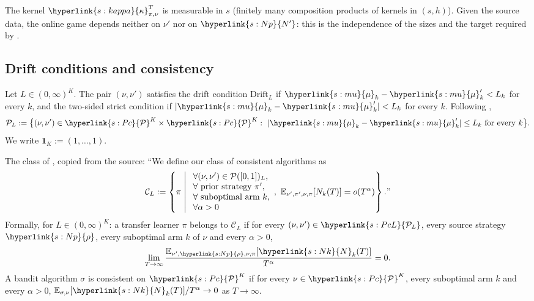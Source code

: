 \documentclass[11pt]{article}
\newcommand{\dt}[1]{\hypertarget{#1}{}}
\newcommand{\sy}[2]{\hyperlink{#1}{#2}}
\newcommand{\E}{\mathbb{E}}
\newcommand{\Pc}{\sy{s:Pc}{\mathcal{P}}}
\newcommand{\PcL}[1][L]{\sy{s:PcL}{\mathcal{P}_{#1}}}
\newcommand{\Np}{\sy{s:Np}{N'}}
\newcommand{\rhos}{\sy{s:Np}{\rho}}
\newcommand{\kap}{\sy{s:kappa}{\kappa}}
\newcommand{\Nc}{\sy{s:Nk}{N}}
\newcommand{\mean}{\sy{s:mu}{\mu}}
\begin{document}
The kernel $\kap^T_{\pi,\nu}$ is measurable in $s$ (finitely many composition products of kernels in
$(s,h)$). Given the source data, the online game depends neither on $\nu'$ nor on $\Np$: this is the
independence of the sizes and the target required by \citet[Section~3.2]{PMRM26}.

\subsection{Drift conditions and consistency}\label{sec:setting-class}

\begin{definition}\label{def:drift}
Let $L\in(0,\infty)^K$. The pair $(\nu,\nu')$ satisfies the drift condition
\dt{s:Drift}$\mathrm{Drift}_L$ if $\mean_k-\mean'_k<L_k$ for every $k$, and the two-sided strict
condition if $|\mean_k-\mean'_k|<L_k$ for every $k$. Following \citet[Section~4.2]{PMRM26},\dt{s:PcL}
\begin{equation*}
\mathcal P_L:=\big\{(\nu,\nu')\in\Pc^K\times\Pc^K:\ |\mean_k-\mean'_k|\le L_k\text{ for every }k\big\}.
\end{equation*}
We write \dt{s:one}$\mathbf 1_K:=(1,\dots,1)$.
\end{definition}

\begin{definition}[Consistency]\label{def:consistency}
The class of \citet[Section~4.2]{PMRM26}, copied from the source: ``We define our class of
consistent algorithms as
\[
\mathcal{C}_{L}:=\left\{\pi\;\middle|\;\begin{array}[]{l}\forall(\nu,\nu^{\prime})\in\mathcal{P}([0,1])_{L},\\\forall\text{ prior strategy }\pi^{\prime},\\\forall\text{ suboptimal arm }k,\\\forall\alpha>0\end{array},\ \mathbb{E}_{\nu^{\prime},\pi^{\prime},\nu,\pi}[N_{k}(T)]=o(T^{\alpha})\right\}.\text{''}
\]
Formally, for $L\in(0,\infty)^K$: a transfer learner $\pi$ belongs to \dt{s:Cl}$\mathcal C_L$ if for
every $(\nu,\nu')\in\PcL$, every source strategy $\rhos$, every suboptimal arm $k$ of $\nu$ and every
$\alpha>0$,
\begin{equation*}
\lim_{T\to\infty}\frac{\E_{\nu',\rhos,\nu,\pi}[\Nc_k(T)]}{T^{\alpha}}=0.
\end{equation*}
A bandit algorithm $\sigma$ is consistent on $\Pc^K$ \citep[Section~4.1]{PMRM26} if for every
$\nu\in\Pc^K$, every suboptimal arm $k$ and every $\alpha>0$, $\E_{\sigma,\nu}[\Nc_k(T)]/T^{\alpha}\to0$
as $T\to\infty$.
\end{definition}
\end{document}
